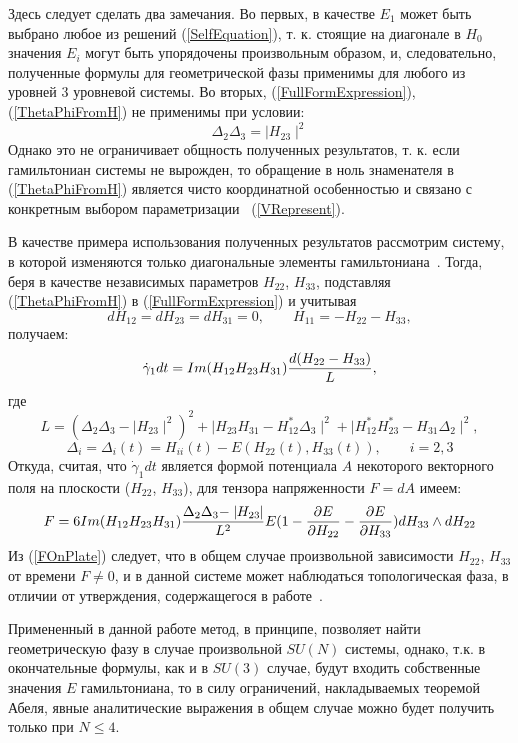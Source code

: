\documentclass[a4paper]{article}
\def\Vhat{ \ifmmode {\hat V} \else {$\hat V$} \fi}
\def\mod#1{\mid\!\!#1\!\!\mid}
\begin{document}
Здесь следует сделать два замечания. Во первых, в качестве $E_1$
может быть выбрано любое из решений (\ref{SelfEquation}),
т. к. стоящие на диагонале в $H_0$ значения
$E_i$ могут быть упорядочены произвольным образом, и, следовательно,
полученные формулы для геометрической фазы применимы для любого из уровней
3 уровневой системы. Во вторых, (\ref{FullFormExpression}),
(\ref{ThetaPhiFromH}) не применимы при условии:
\begin{equation}
  \Delta_2 \Delta_3 = \mod{H_{23}}^2
\end{equation}
Однако это не ограничивает общность полученных результатов,
т. к. если гамильтониан системы не вырожден, то обращение в ноль
знаменателя в (\ref{ThetaPhiFromH}) является чисто координатной особенностью
и связано с конкретным выбором параметризации \Vhat~(\ref{VRepresent}).

В качестве примера использования полученных результатов рассмотрим систему,
в которой изменяются только диагональные элементы
гамильтониана~\cite{NaumovWork}. Тогда, беря в качестве независимых
параметров $H_{22}$, $H_{33}$,
подставляя (\ref{ThetaPhiFromH}) в (\ref{FullFormExpression}) и учитывая
$$
   dH_{12} = dH_{23} = dH_{31} = 0, \qquad H_{11} = - H_{22} - H_{33},
$$
получаем:
$$
  \dot \gamma_1 dt = Im(H_{12}H_{23}H_{31}) {d(H_{22} - H_{33}) \over L},
$$
   где
$$
    L = (\Delta_2 \Delta_3 - \mod{H_{23}}^2)^2
     + \mod{H_{23}H_{31} - H_{12}^{\ast} \Delta_3}^2
     + \mod{H_{12}^{\ast}H_{23}^{\ast} - H_{31}\Delta_2}^2,
$$
$$
    \Delta_{i} = \Delta_{i}(t) = H_{ii}(t) - E(H_{22}(t), H_{33}(t)), 
\qquad i = 2, 3
$$
   Откуда, считая, что $\dot \gamma_1dt$ является формой потенциала $A$
  некоторого векторного поля на плоскости ($H_{22}$, $H_{33}$), для тензора
  напряженности $F=dA$ имеем:
\begin{equation}
   F =
    6 Im(H_{12}H_{23}H_{31}) { \Delta_2 \Delta_3 - \mod{H_{23}} \over 
L^2 } E
  (1-{ \partial E \over \partial H_{22} }-{ \partial E \over \partial 
H_{33} })
   dH_{33} \wedge dH_{22}
  \label{FOnPlate}
\end{equation}
   Из (\ref{FOnPlate}) следует, что в общем случае произвольной зависимости
$H_{22}$, $H_{33}$ от времени $F \ne 0$, и в данной
системе может наблюдаться топологическая фаза, в отличии от утверждения,
содержащегося в работе~\cite{NaumovWork}.


Примененный в данной работе метод, в принципе, позволяет найти 
геометрическую
фазу в случае
произвольной $SU(N)$ системы, однако, т.к. в окончательные формулы,
как и в $SU(3)$ случае, будут входить собственные значения $E$
гамильтониана, то в силу ограничений, накладываемых теоремой Абеля, явные
аналитические выражения в общем случае можно будет получить
только при $N \le 4$.
\end{document}
